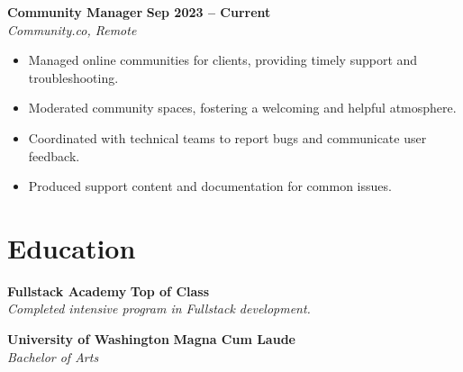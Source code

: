 \documentclass[a4paper,10pt]{article}
\begin{document}
\vspace{0.5em}
\textbf{Community Manager} \hfill \textbf{Sep 2023 -- Current} \\
\textit{Community.co, Remote}
\begin{itemize}[leftmargin=*, nosep]
    \item Managed online communities for clients, providing timely support and troubleshooting.
    \item Moderated community spaces, fostering a welcoming and helpful atmosphere.
    \item Coordinated with technical teams to report bugs and communicate user feedback.
    \item Produced support content and documentation for common issues.
\end{itemize}

\section{Education}

\textbf{Fullstack Academy} \hfill \textbf{Top of Class} \\
\textit{Completed intensive program in Fullstack development.}

\textbf{University of Washington} \hfill \textbf{Magna Cum Laude} \\
\textit{Bachelor of Arts}
\end{document}

